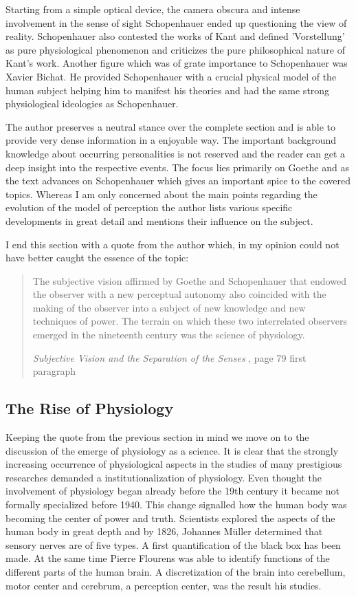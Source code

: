 \documentclass[12pt,a4paper]{article}
\begin{document}
Starting from a simple optical device, the camera obscura and intense involvement in the sense of sight
Schopenhauer ended up questioning the view of reality. Schopenhauer also contested the works of Kant
and defined 'Vorstellung' as pure physiological phenomenon and criticizes the pure philosophical nature
of Kant's work. Another figure which was of grate importance to Schopenhauer was Xavier Bichat.
He provided Schopenhauer with a crucial physical model of the human subject helping him to manifest
his theories and had the same strong physiological ideologies as Schopenhauer.

The author preserves a neutral stance over the complete section and is able to provide
very dense information in a enjoyable way. The important background knowledge about occurring
personalities is not reserved and the reader can get a deep insight into the respective events.
The focus lies primarily on Goethe and as the text advances on Schopenhauer which gives an important spice
to the covered topics. Whereas I am only concerned about the main points regarding the evolution of the
model of perception the author lists various specific developments in great detail and mentions their
influence on the subject.

I end this section with a quote from the author which, in my opinion could not have better caught
the essence of the topic:

\begin{quote}

The subjective vision affirmed by Goethe and Schopenhauer that endowed the observer with a new perceptual
autonomy also coincided with the making of the observer into a subject of new knowledge and new
techniques of power. The terrain on which these two interrelated observers emerged in the nineteenth
century was the science of physiology. 

{\it{Subjective Vision and the Separation of the Senses}} \cite{crary}, page 79 first paragraph

\end{quote}

\subsection*{The Rise of Physiology}

Keeping the quote from the previous section in mind we move on to the discussion of the
emerge of physiology as a science.
It is clear that the strongly increasing occurrence of physiological aspects in the studies of many
prestigious researches demanded a institutionalization of physiology. Even thought the involvement
of physiology began already before the 19th century it became not formally specialized before 1940.
This change signalled how the human body was becoming the center of power and truth.
Scientists explored the aspects of the human body in great depth and by 1826, Johannes Müller
determined that sensory nerves are of five types. A first quantification of the black box has been made.
At the same time Pierre Flourens was able to identify functions of the different parts of the human
brain. A discretization of the brain into cerebellum, motor center and cerebrum, a perception center,
was the result his studies.
\end{document}
